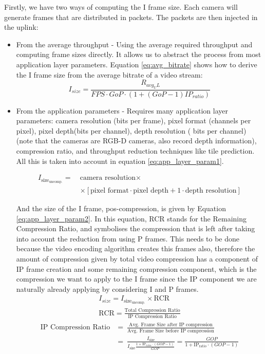 Firstly, we have two ways of computing the I frame size. Each camera will generate frames that are distributed in packets. The packets are then injected in the uplink:
\begin{itemize}
    \item From the average throughput - Using the average required throughput and computing frame sizes directly. It allows us to abstract the process from most application layer parameters. Equation \eqref{eq:avg_bitrate} shows how to derive the I frame size from the average bitrate of a video stream:
    \begin{equation} \label{eq:avg_bitrate} 
        I_{size} = \frac{R_{avg_UL}}{FPS \cdot GoP \cdot \left( 1 + (GoP - 1) IP_{ratio}\right)}
    \end{equation}
    
    \item From the application parameters - Requires many application layer parameters: camera resolution (bits per frame), pixel format (channels per pixel), pixel depth(bits per channel), depth resolution ( bits per channel) (note that the cameras are RGB-D cameras, also record depth information), compression ratio, and throughput reduction techniques like tile prediction.
    All this is taken into account in equation \eqref{eq:app_layer_param1}. 

    \begin{align}
        I_{{\text{size}}_\text{uncomp.}} = \ & \text{camera resolution} \times \nonumber \\
        & \times \left[  \text{pixel format} \cdot \text{pixel depth} + 1 \cdot \text{depth resolution} \right]  \label{eq:app_layer_param1}
    \end{align}

    And the size of the I frame, pos-compression, is given by Equation \eqref{eq:app_layer_param2}. In this equation, RCR stands for the Remaining Compression Ratio, and symbolises the compression that is left after taking into account the reduction from using P frames. This needs to be done because the video encoding algorithm creates this frames also, therefore the amount of compression given by total video compression has a component of IP frame creation and some remaining compression component, which is the compression we want to apply to the I frame since the IP component we are naturally already applying by considering I and P frames.
    \begin{gather}
        I_{size} = I_{{\text{size}}_\text{uncomp.}} \times \text{RCR}  \label{eq:app_layer_param2} \\
        \text{RCR} = \frac{\text{Total Compression Ratio}}{\text{IP Compression Ratio}} \label{eq:app_layer_param3} 
    \end{gather}
    \begin{align}
        \text{IP Compression Ratio} & = \ \frac{\text{Avg. Frame Size after IP compression}}{\text{Avg. Frame Size before IP compression}} \nonumber \\
        & = \ \frac{I_\text{size}}{I_\text{size} \frac{1 + \text{IP}_\text{ratio} \cdot (GOP - 1)}{GOP}} = \frac{GOP}{1 + \text{IP}_\text{ratio} \cdot (GOP - 1)}\label{eq:app_layer_param4} 
    \end{align}


\end{itemize}
